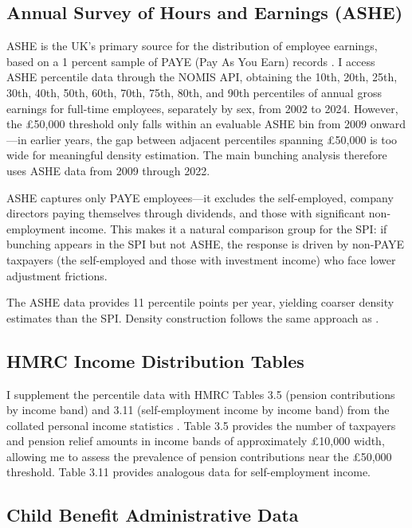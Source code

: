\documentclass[12pt]{article}
\begin{document}
\subsection{Annual Survey of Hours and Earnings (ASHE)}

ASHE is the UK's primary source for the distribution of employee earnings, based on a 1 percent sample of PAYE (Pay As You Earn) records \citep{ons_ashe2024}. I access ASHE percentile data through the NOMIS API, obtaining the 10th, 20th, 25th, 30th, 40th, 50th, 60th, 70th, 75th, 80th, and 90th percentiles of annual gross earnings for full-time employees, separately by sex, from 2002 to 2024. However, the \pounds50,000 threshold only falls within an evaluable ASHE bin from 2009 onward---in earlier years, the gap between adjacent percentiles spanning \pounds50,000 is too wide for meaningful density estimation. The main bunching analysis therefore uses ASHE data from 2009 through 2022.

ASHE captures only PAYE employees---it excludes the self-employed, company directors paying themselves through dividends, and those with significant non-employment income. This makes it a natural comparison group for the SPI: if bunching appears in the SPI but not ASHE, the response is driven by non-PAYE taxpayers (the self-employed and those with investment income) who face lower adjustment frictions.

The ASHE data provides 11 percentile points per year, yielding coarser density estimates than the SPI. Density construction follows the same approach as .

\subsection{HMRC Income Distribution Tables}

I supplement the percentile data with HMRC Tables 3.5 (pension contributions by income band) and 3.11 (self-employment income by income band) from the collated personal income statistics \citep{hmrc_spi2024}. Table 3.5 provides the number of taxpayers and pension relief amounts in income bands of approximately \pounds10,000 width, allowing me to assess the prevalence of pension contributions near the \pounds50,000 threshold. Table 3.11 provides analogous data for self-employment income.

\subsection{Child Benefit Administrative Data}
\end{document}
